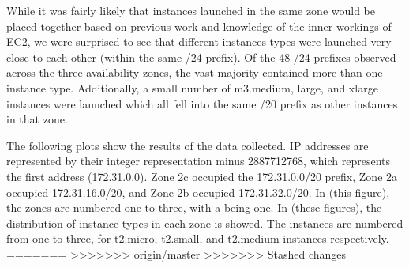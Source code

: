 \documentclass[conference]{IEEEtran}
\begin{document}
While it was fairly likely that instances launched in the same zone would be placed together based on previous 
work and knowledge of the inner workings of EC2, we were surprised to see that different instances types were launched 
very close to each other (within the same /24 prefix). 
Of the 48 /24 prefixes observed across the three availability zones, the vast majority contained more than one 
instance type. 
Additionally, a small number of m3.medium, large, and xlarge instances were launched which all fell into the same 
/20 prefix as other instances in that zone.

The following plots show the results of the data collected. 
IP addresses are represented by their integer representation minus 2887712768, which represents the first address 
(172.31.0.0). 
Zone 2c occupied the 172.31.0.0/20 prefix, Zone 2a occupied 172.31.16.0/20, and Zone 2b occupied 172.31.32.0/20. 
In (this figure), the zones are numbered one to three, with a being one.
In (these figures), the distribution of instance types in each zone is showed. The instances are numbered from 
one to three, for t2.micro, t2.small, and t2.medium instances respectively.
=======
>>>>>>> origin/master
>>>>>>> Stashed changes
\end{document}
